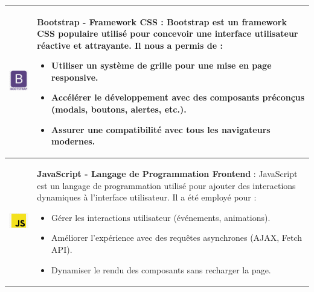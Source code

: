 \begin{longtable}{|m{4cm}|m{10cm}|}
    \includegraphics[width=3cm]{images/logo/bootstrap.png} & 
    \textbf{Bootstrap - Framework CSS} : Bootstrap est un framework CSS populaire utilisé pour concevoir une interface utilisateur réactive et attrayante. Il nous a permis de :  
    \begin{itemize}
        \item Utiliser un système de grille pour une mise en page responsive.
        \item Accélérer le développement avec des composants préconçus (modals, boutons, alertes, etc.).
        \item Assurer une compatibilité avec tous les navigateurs modernes.
    \end{itemize}\\
    \hline

    \includegraphics[width=3cm]{images/logo/javascript.png} & 
    \textbf{JavaScript - Langage de Programmation Frontend} : JavaScript est un langage de programmation utilisé pour ajouter des interactions dynamiques à l'interface utilisateur. Il a été employé pour :  
    \begin{itemize}
        \item Gérer les interactions utilisateur (événements, animations).
        \item Améliorer l'expérience avec des requêtes asynchrones (AJAX, Fetch API).
        \item Dynamiser le rendu des composants sans recharger la page.
    \end{itemize}\\
    \hline


\end{longtable}
